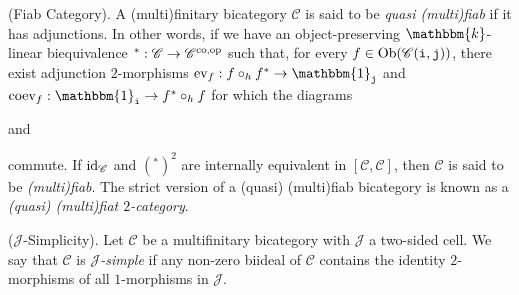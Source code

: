 \noindent\begin{definition}\textup{(Fiab Category).}\label{Fiab} A (multi)finitary bicategory $\mathscr{C}$ is said to be {\em quasi (multi)fiab} if it has adjunctions. In other words, if we have an object-preserving $\mathbbm{k}$-linear biequivalence ${}^* : \mathscr{C} \to \mathscr{C}^\textup{co,op}$ such that, for every $f \in \textup{Ob}(\mathscr{C}(\textup{\texttt{i}}, \textup{\texttt{j}}))$, there exist adjunction $2$-morphisms $\textup{ev}_f : f \circ_h f^* \to \mathbbm{1}_\textobj{j}$ and $\textup{coev}_f : \mathbbm{1}_\textobj{i} \to f^* \circ_h f$ for which the diagrams
\begin{center}
and
\end{center}
\noindent commute. If $\textnormal{id}_\mathscr{C}$ and $({}^*)^2$ are internally equivalent in $[\mathscr{C}, \mathscr{C}]$, then $\mathscr{C}$ is said to be {\em (multi)fiab}. The strict version of a (quasi) (multi)fiab bicategory is known as a {\em (quasi) (multi)fiat $2$-category}.\\
\end{definition}

\noindent\begin{definition}\textup{($\mathcal{J}$-Simplicity).} Let $\mathscr{C}$ be a multifinitary bicategory with $\mathcal{J}$ a two-sided cell. We say that $\mathscr{C}$ is {\em $\mathcal{J}$-simple} if any non-zero biideal of $\mathscr{C}$ contains the identity $2$-morphisms of all $1$-morphisms in $\mathcal{J}$.\\
\end{definition}

